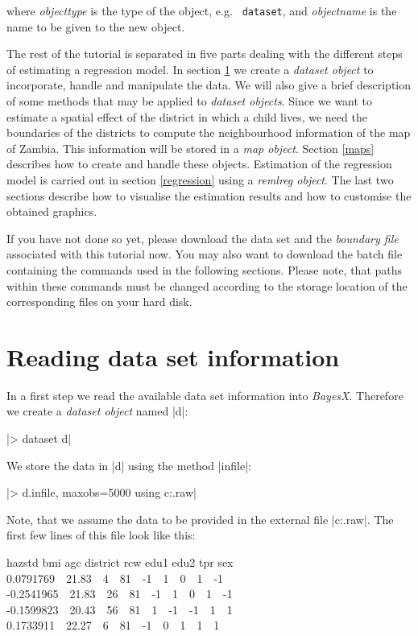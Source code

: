 \documentclass[a4paper]{article}
\begin{document}
where {\em objecttype} is the type of the object, e.g. {\tt
dataset}, and {\em objectname} is the name to be given to the new
object.

The rest of the tutorial is separated in five parts dealing with
the different steps of estimating a regression model. In section
\ref{datasets} we create a {\em dataset object} to incorporate,
handle and manipulate the data. We will also give a brief
description of some methods that may be applied to {\em dataset
objects}. Since we want to estimate a spatial effect of the
district in which a child lives, we need the boundaries of the
districts to compute the neighbourhood information of the map of
Zambia. This information will be stored in a {\em map object}.
Section \ref{maps} describes how to create and handle these
objects. Estimation of the regression model is carried out in
section \ref{regression} using a {\em remlreg object}. The last
two sections describe how to visualise the estimation results and
how to customise the obtained graphics.

If you have not done so yet, please download the data set and the
{\it boundary file} associated with this tutorial now. You may
also want to download the batch file containing the commands used
in the following sections. Please note, that paths within these
commands must be changed according to the storage location of the
corresponding files on your hard disk.

\section{Reading data set information}\label{datasets}

In a first step we read the available data set information into {\it BayesX}. Therefore we create a {\it dataset object} named
|d|:

|> dataset d|

We store the data in |d| using the method |infile|:

|> d.infile, maxobs=5000 using c:\data\zambia.raw|

Note, that we assume the data to be provided in the external file
|c:\data\zambia.raw|. The first few lines of this file look like
this:

{\footnotesize
 hazstd bmi agc district rcw edu1 edu2 tpr sex\\
 0.0791769 \,\, 21.83 \,\, 4 \,\, 81 \,\, -1 \,\, 1 \,\, 0 \,\, 1 \,\, -1\\
 -0.2541965 \,\, 21.83 \,\, 26 \,\, 81 \,\, -1 \,\, 1 \,\, 0 \,\, 1 \,\, -1\\
 -0.1599823 \,\, 20.43 \,\, 56 \,\, 81 \,\, 1 \,\, -1 \,\, -1 \,\, 1 \,\, 1\\
 0.1733911 \,\, 22.27 \,\, 6 \,\, 81 \,\, -1 \,\, 0 \,\, 1 \,\, 1 \,\, 1}
\end{document}
